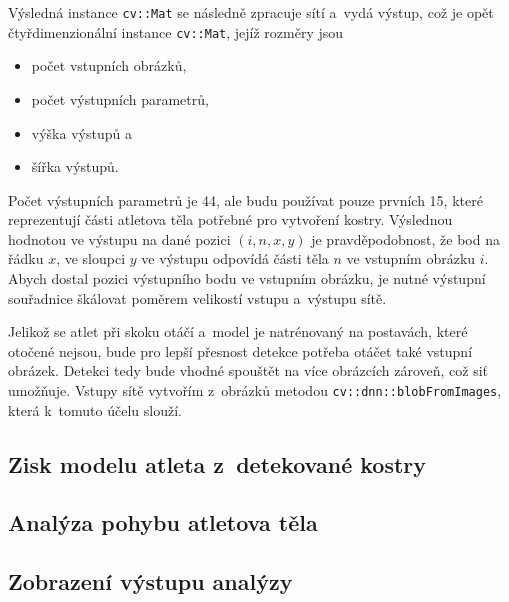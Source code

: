 Výsledná instance \texttt{cv::Mat} se následně zpracuje sítí a~vydá výstup, což je opět čtyřdimenzionální instance \texttt{cv::Mat}, jejíž rozměry jsou
\begin{itemize}
\item počet vstupních obrázků,
\item počet výstupních parametrů,
\item výška výstupů a
\item šířka výstupů.
\end{itemize}
Počet výstupních parametrů je 44, ale budu používat pouze prvních 15, které reprezentují části atletova těla potřebné pro vytvoření kostry. Výslednou hodnotou ve výstupu na dané pozici $(i,n,x,y)$ je pravděpodobnost, že bod na řádku $x$, ve sloupci $y$ ve výstupu odpovídá části těla $n$ ve vstupním obrázku $i$. Abych dostal pozici výstupního bodu ve vstupním obrázku, je nutné výstupní souřadnice škálovat poměrem velikostí vstupu a~výstupu sítě.

Jelikož se atlet při skoku otáčí a~model je natrénovaný na postavách, které otočené nejsou, bude pro lepší přesnost detekce potřeba otáčet také vstupní obrázek. Detekci tedy bude vhodné spouštět na více obrázcích zároveň, což siť umožňuje. Vstupy sítě vytvořím z~obrázků metodou \texttt{cv::dnn::blobFromImages}, která k~tomuto účelu slouží.

\subsection{Zisk modelu atleta z~detekované kostry}

\subsection{Analýza pohybu atletova těla}

\subsection{Zobrazení výstupu analýzy}
















